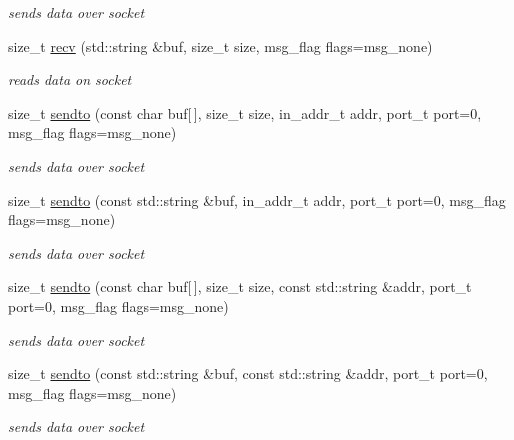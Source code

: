 \begin{CompactItemize}
\begin{CompactItemize}
\begin{CompactList}\small\item\em sends data over socket \item\end{CompactList}\item 
size\_\-t \hyperlink{classsocketpp_1_1BaseSocket_d36a1139d9e931d172e9c45171609b66}{recv} (std::string \&buf, size\_\-t size, msg\_\-flag flags=msg\_\-none)
\begin{CompactList}\small\item\em reads data on socket \item\end{CompactList}\item 
size\_\-t \hyperlink{classsocketpp_1_1BaseSocket_d6df36281c6fce81e5c4c493ac91a6f8}{sendto} (const char buf\mbox{[}$\,$\mbox{]}, size\_\-t size, in\_\-addr\_\-t addr, port\_\-t port=0, msg\_\-flag flags=msg\_\-none)
\begin{CompactList}\small\item\em sends data over socket \item\end{CompactList}\item 
size\_\-t \hyperlink{classsocketpp_1_1BaseSocket_5a2b11a5b30d54cc303f480eeb5642b1}{sendto} (const std::string \&buf, in\_\-addr\_\-t addr, port\_\-t port=0, msg\_\-flag flags=msg\_\-none)
\begin{CompactList}\small\item\em sends data over socket \item\end{CompactList}\item 
size\_\-t \hyperlink{classsocketpp_1_1BaseSocket_33e5d93278884480c62a1586a2a4a114}{sendto} (const char buf\mbox{[}$\,$\mbox{]}, size\_\-t size, const std::string \&addr, port\_\-t port=0, msg\_\-flag flags=msg\_\-none)
\begin{CompactList}\small\item\em sends data over socket \item\end{CompactList}\item 
size\_\-t \hyperlink{classsocketpp_1_1BaseSocket_63cabdd45f7985f6a63cf11eb2e031c5}{sendto} (const std::string \&buf, const std::string \&addr, port\_\-t port=0, msg\_\-flag flags=msg\_\-none)
\begin{CompactList}\small\item\em sends data over socket \item\end{CompactList}\item 

\end{CompactItemize}
\end{CompactItemize}
